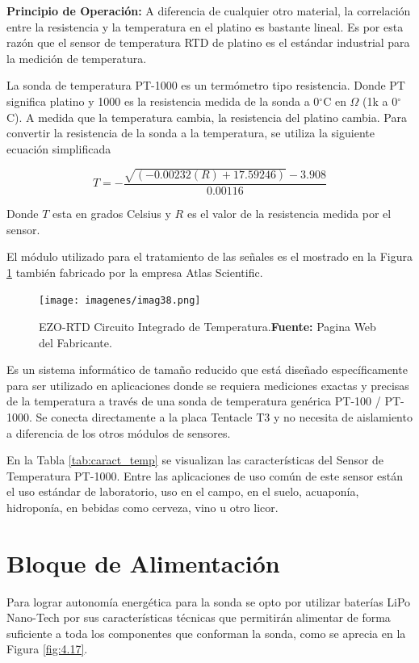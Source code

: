 \textbf{Principio de Operación: }
A diferencia de cualquier otro material, la correlación entre la resistencia y la temperatura en el platino es bastante lineal. Es por esta razón que el sensor de temperatura RTD de platino es el estándar industrial para la medición de temperatura.

La sonda de temperatura PT-1000 es un termómetro tipo resistencia. Donde PT significa platino y 1000 es la resistencia medida de la sonda a 0$^{\circ}$C en $\Omega$ (1k a 0$^{\circ}$C).
A medida que la temperatura cambia, la resistencia del platino cambia.
Para convertir la resistencia de la sonda a la temperatura, se utiliza la siguiente ecuación simplificada

\begin{equation}
    T=-\frac{\sqrt{(-0.00232(R)+17.59246)}-3.908}{0.00116}
\end{equation}

Donde $T$ esta en grados Celsius y $R$ es el valor de la resistencia medida por el sensor.

El módulo utilizado para el tratamiento de las señales es el mostrado en la Figura \ref{fig:4.16} también fabricado por la empresa Atlas Scientific.
\begin{figure}[t]
    \centering
    \texttt{[image: imagenes/imag38.png]}
    \caption[EZO-RTD Circuito Integrado de Temperatura]{EZO-RTD Circuito Integrado de Temperatura.\textbf{Fuente: }Pagina Web del Fabricante.}
    \label{fig:4.16}
\end{figure}
Es un sistema informático de tamaño reducido que está diseñado específicamente para ser utilizado en aplicaciones donde se requiera mediciones exactas y precisas de la temperatura a través de una sonda de temperatura genérica PT-100 / PT-1000. Se conecta directamente a la placa Tentacle T3 y no necesita de aislamiento a diferencia de los otros módulos de sensores.

En la Tabla \ref{tab:caract_temp} se visualizan las características del Sensor de Temperatura PT-1000.
Entre las aplicaciones de uso común de este sensor están el uso estándar de laboratorio, uso en el campo, en el suelo, acuaponía, hidroponía, en bebidas como cerveza, vino u otro licor.

\section[Bloque de Alimentación]{Bloque de Alimentación}

Para lograr autonom\'ia energ\'etica para la sonda se opto por utilizar bater\'ias LiPo Nano-Tech por sus caracter\'isticas t\'ecnicas que permitir\'an alimentar de forma suficiente a toda los componentes que conforman la sonda, como se aprecia en la Figura \ref{fig:4.17}. 

